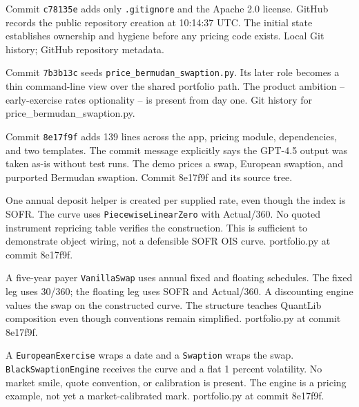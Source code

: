 
{Commit \texttt{c78135e} adds only \texttt{.gitignore} and the Apache 2.0 license.}
{GitHub records the public repository creation at 10:14:37 UTC.}
{The initial state establishes ownership and hygiene before any pricing code exists.}
{Local Git history; GitHub repository metadata.}

{Commit \texttt{7b3b13c} seeds \texttt{price\_bermudan\_swaption.py}.}
{Its later role becomes a thin command-line view over the shared portfolio path.}
{The product ambition -- early-exercise rates optionality -- is present from day one.}
{Git history for price\_bermudan\_swaption.py.}

{Commit \texttt{8e17f9f} adds 139 lines across the app, pricing module, dependencies, and two templates.}
{The commit message explicitly says the GPT-4.5 output was taken as-is without test runs.}
{The demo prices a swap, European swaption, and purported Bermudan swaption.}
{Commit 8e17f9f and its source tree.}

{One annual deposit helper is created per supplied rate, even though the index is SOFR.}
{The curve uses \texttt{PiecewiseLinearZero} with Actual/360.}
{No quoted instrument repricing table verifies the construction.}
{This is sufficient to demonstrate object wiring, not a defensible SOFR OIS curve.}
{portfolio.py at commit 8e17f9f.}

{A five-year payer \texttt{VanillaSwap} uses annual fixed and floating schedules.}
{The fixed leg uses 30/360; the floating leg uses SOFR and Actual/360.}
{A discounting engine values the swap on the constructed curve.}
{The structure teaches QuantLib composition even though conventions remain simplified.}
{portfolio.py at commit 8e17f9f.}

{A \texttt{EuropeanExercise} wraps a date and a \texttt{Swaption} wraps the swap.}
{\texttt{BlackSwaptionEngine} receives the curve and a flat 1 percent volatility.}
{No market smile, quote convention, or calibration is present.}
{The engine is a pricing example, not yet a market-calibrated mark.}
{portfolio.py at commit 8e17f9f.}

